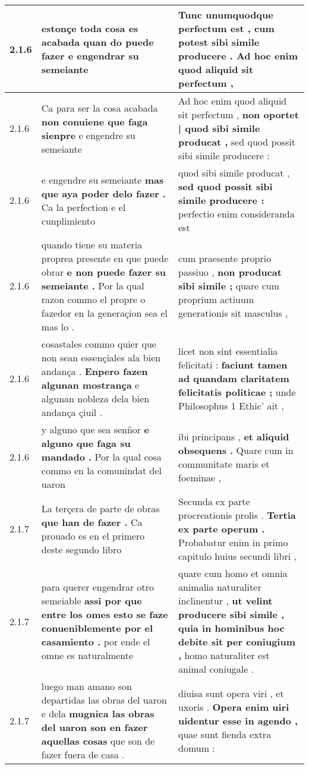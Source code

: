 \begin{tabular}{|p{1cm}|p{6.5cm}|p{6.5cm}|}
2.1.6 & estonçe toda cosa es acabada \textbf{ quan do puede fazer } e engendrar su semeiante & Tunc unumquodque perfectum est , \textbf{ cum potest sibi simile producere . } Ad hoc enim quod aliquid sit perfectum , \\\hline
2.1.6 & Ca para ser la cosa acabada \textbf{ non conuiene que faga sienpre } e engendre su semeiante & Ad hoc enim quod aliquid sit perfectum , \textbf{ non oportet | quod sibi simile producat , } sed quod possit sibi simile producere : \\\hline
2.1.6 & e engendre su semeiante \textbf{ mas que aya poder delo fazer . } Ca la perfection e el cunplimiento & quod sibi simile producat , \textbf{ sed quod possit sibi simile producere : } perfectio enim consideranda est \\\hline
2.1.6 & quando tiene su materia proprea presente en que puede obrar \textbf{ e non puede fazer su semeiante . } Por la qual razon commo el propre o fazedor en la generaçion sea el mas lo . & cum praesente proprio passiuo , \textbf{ non producat sibi simile ; } quare cum proprium actiuum generationis sit masculus , \\\hline
2.1.6 & cosastales commo quier que non sean essençiales ala bien andança . \textbf{ Enpero fazen algunan mostrança } e algunan nobleza dela bien andança çiuil . & licet non sint essentialia felicitati : \textbf{ faciunt tamen ad quandam claritatem felicitatis politicae ; } unde Philosophus 1 Ethic’ ait , \\\hline
2.1.6 & y alguno que sea senñor \textbf{ e alguno que faga su mandado . } Por la qual cosa commo en la comunindat del uaron & ibi principans , \textbf{ et aliquid obsequens . } Quare cum in communitate maris et foeminae , \\\hline
2.1.7 & La terçera de parte de obras \textbf{ que han de fazer . } Ca prouado es en el primero deste segundo libro & Secunda ex parte procreationis prolis . \textbf{ Tertia ex parte operum . } Probabatur enim in primo capitulo huius secundi libri , \\\hline
2.1.7 & para querer engendrar otro semeiable \textbf{ assi por que entre los omes esto se faze conueniblemente por el casamiento . } por ende el omne es naturalmente & quare cum homo et omnia animalia naturaliter inclinentur , \textbf{ ut velint producere sibi simile , quia in hominibus hoc debite sit per coniugium , } homo naturaliter est animal coniugale . \\\hline
2.1.7 & luego man amano son departidas las obras del uaron e dela \textbf{ mugnỉca las obras del uaron son en fazer aquellas cosas } que son de fazer fuera de casa . & diuisa sunt opera viri , et uxoris . \textbf{ Opera enim uiri uidentur esse in agendo , } quae sunt fienda extra domum : \\\hline

\end{tabular}
